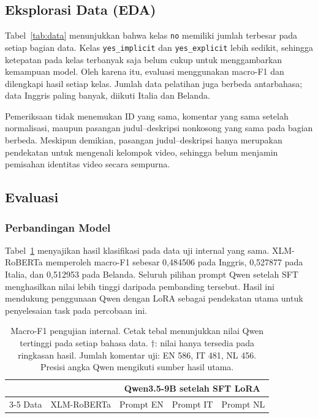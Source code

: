 \documentclass[11pt]{article}
\begin{document}
\subsection{Eksplorasi Data (EDA)}
Tabel~\ref{tab:data} menunjukkan bahwa kelas \texttt{no} memiliki jumlah terbesar pada setiap bagian data. Kelas \texttt{yes\_implicit} dan \texttt{yes\_explicit} lebih sedikit, sehingga ketepatan pada kelas terbanyak saja belum cukup untuk menggambarkan kemampuan model. Oleh karena itu, evaluasi menggunakan macro-F1 dan dilengkapi hasil setiap kelas. Jumlah data pelatihan juga berbeda antarbahasa; data Inggris paling banyak, diikuti Italia dan Belanda.

Pemeriksaan tidak menemukan ID yang sama, komentar yang sama setelah normalisasi, maupun pasangan judul--deskripsi nonkosong yang sama pada bagian berbeda. Meskipun demikian, pasangan judul--deskripsi hanya merupakan pendekatan untuk mengenali kelompok video, sehingga belum menjamin pemisahan identitas video secara sempurna.

\subsection{Evaluasi}
\subsubsection{Perbandingan Model}
Tabel~\ref{tab:main} menyajikan hasil klasifikasi pada data uji internal yang sama. XLM-RoBERTa memperoleh macro-F1 sebesar 0,484506 pada Inggris, 0,527877 pada Italia, dan 0,512953 pada Belanda. Seluruh pilihan prompt Qwen setelah SFT menghasilkan nilai lebih tinggi daripada pembanding tersebut. Hasil ini mendukung penggunaan Qwen dengan LoRA sebagai pendekatan utama untuk penyelesaian task pada percobaan ini.

\begin{table}[t]
\centering
\begin{tabular}{lrrrr}
\toprule
& & \multicolumn{3}{c}{Qwen3.5-9B setelah SFT LoRA} \\
\cmidrule(lr){3-5}
Data & XLM-RoBERTa & Prompt EN & Prompt IT & Prompt NL \\
\midrule

\end{tabular}
\caption{Macro-F1 pengujian internal. Cetak tebal menunjukkan nilai Qwen tertinggi pada setiap bahasa data. $\dagger$: nilai hanya tersedia pada ringkasan hasil. Jumlah komentar uji: EN 586, IT 481, NL 456. Presisi angka Qwen mengikuti sumber hasil utama.}
\label{tab:main}
\end{table}
\end{document}
